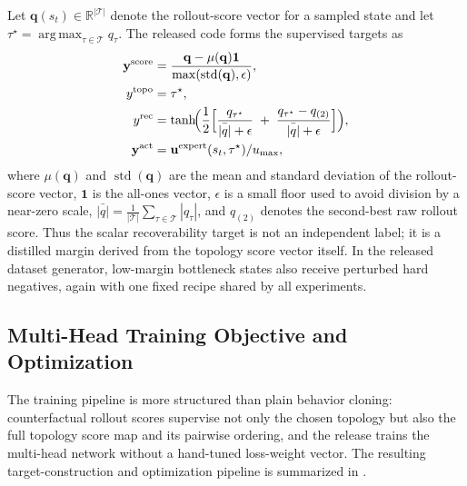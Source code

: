 \documentclass[journal]{IEEEtran}
\DeclareMathOperator*{\argmax}{arg\,max}
\newcommand{\R}{\mathbb{R}}
\newcommand{\cT}{\mathcal{T}}
\newcommand{\bfu}{\mathbf{u}}
\begin{document}
Let $\mathbf{q}(s_t)\in\R^{|\cT|}$ denote the rollout-score vector for a
sampled state and let $\tau^\star=\argmax_{\tau\in\cT} q_\tau$. The
released code forms the supervised targets as
\begingroup\footnotesize
\begin{equation}
\begin{aligned}
\mathbf{y}^{\mathrm{score}}
&= \frac{\mathbf{q}-\mu(\mathbf{q})\mathbf{1}}
         {\max(\operatorname{std}(\mathbf{q}),\epsilon)}, \\
y^{\mathrm{topo}} &= \tau^\star, \\
y^{\mathrm{rec}}
&= \tanh\!\Bigl(
\frac{1}{2}
\Bigl[
\frac{q_{\tau^\star}}{\bar{|q|}+\epsilon}
\;+\;
\frac{q_{\tau^\star}-q_{(2)}}{\bar{|q|}+\epsilon}
\Bigr]
\Bigr), \\
\mathbf{y}^{\mathrm{act}}
&= \bfu^{\mathrm{expert}}(s_t,\tau^\star) / u_{\max},
\label{eq:targets}
\end{aligned}
\end{equation}
\endgroup
where $\mu(\mathbf{q})$ and $\operatorname{std}(\mathbf{q})$ are the mean and
standard deviation of the rollout-score vector, $\mathbf{1}$ is the
all-ones vector, $\epsilon$ is a small floor used to avoid division by a
near-zero scale, $\bar{|q|}=\frac{1}{|\cT|}\sum_{\tau\in\cT}|q_\tau|$, and
$q_{(2)}$ denotes the second-best raw rollout score. Thus the scalar
recoverability target is not an independent label; it is a distilled
margin derived from the topology score vector itself. In the released
dataset generator, low-margin bottleneck states also receive perturbed
hard negatives, again with one fixed recipe shared by all experiments.

\subsection{Multi-Head Training Objective and Optimization}
The training pipeline is more structured than plain behavior cloning:
counterfactual rollout scores supervise not only the chosen topology but
also the full topology score map and its pairwise ordering, and the
release trains the multi-head network without a hand-tuned loss-weight
vector. The resulting target-construction and optimization pipeline is
summarized in .
\end{document}
